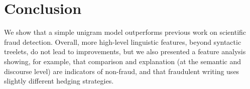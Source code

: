 \documentclass[11pt,letterpaper]{article}
\begin{document}
\section{Conclusion}

We show that a simple unigram model outperforms previous work on scientific fraud detection. Overall, more high-level linguistic features, beyond syntactic treelets, do not lead to improvements, but we also presented a feature analysis showing, for example, that comparison and explanation (at the semantic and discourse level) are indicators of non-fraud, and that fraudulent writing uses slightly different hedging strategies. 





\end{document}
